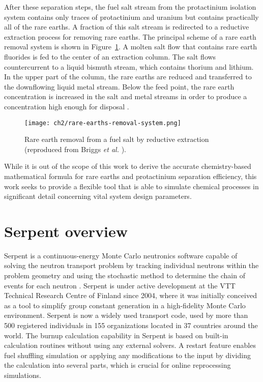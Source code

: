 After these separation steps, the fuel salt stream from the protactinium 
isolation system contains only traces of protactinium and uranium but contains 
practically all of the rare earths. A fraction of this salt stream is 
redirected to a reductive extraction process for removing rare earths.  The 
principal scheme of a rare earth removal system is shown in  
Figure~\ref{fig:rare-earth-removal}. A molten salt flow that contains 
rare earth fluorides is fed to the center of an extraction column. The salt 
flows countercurrent to a liquid bismuth stream, which contains thorium and 
lithium. In the upper part of the column, the rare earths are reduced and 
transferred to the downflowing liquid metal stream. Below the feed point, the 
rare earth concentration is increased in the salt and metal streams in order 
to produce a concentration high enough for disposal 
\cite{briggs_molten-salt_1969}.
\begin{figure}[htbp!]
	\centering
	\texttt{[image: ch2/rare-earths-removal-system.png]}
	\caption{Rare earth removal from a fuel salt by reductive extraction 
		(reproduced from Briggs \emph{et al.} 		
		\cite{briggs_molten-salt_1969}).}
	\label{fig:rare-earth-removal}
\end{figure}

While it is out of the scope of this work to derive the accurate  
chemistry-based mathematical formula for rare earths and protactinium 
separation efficiency, this work seeks to provide a flexible tool that is able 
to simulate chemical processes in significant detail concerning vital system 
design parameters.

\section{Serpent overview}
Serpent is a continuous-energy Monte Carlo neutronics software capable of 
solving the neutron transport problem by tracking individual neutrons within 
the problem geometry and using the stochastic method to determine the chain of 
events for each neutron \cite{leppanen_serpent_2014}. Serpent is under active 
development at the VTT Technical Research Centre of Finland since 2004, where 
it was initially conceived as a tool to simplify group constant generation in 
a high-fidelity Monte Carlo environment. Serpent is now a widely used  
transport code, used by more than 500 registered individuals in 155 
organizations located in 37 countries around the world. The burnup calculation 
capability in Serpent is based on built-in calculation routines without using 
any external solvers. A restart feature enables fuel shuffling simulation or 
applying any modifications to the input by dividing the calculation into 
several parts, which is crucial for online reprocessing simulations.

